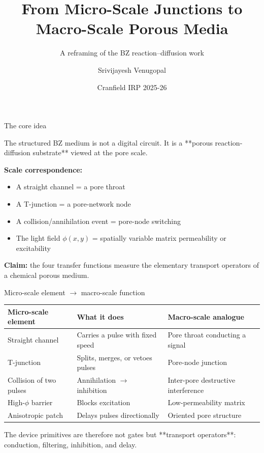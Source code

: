 \documentclass[aspectratio=169,11pt]{beamer}
\title{From Micro-Scale Junctions to Macro-Scale Porous Media}
\subtitle{A reframing of the BZ reaction--diffusion work}
\author{Srivijayesh Venugopal}
\date{Cranfield IRP 2025-26}
\begin{document}
\begin{frame}
\titlepage
\end{frame}

\begin{frame}{The core idea}

The structured BZ medium is not a digital circuit. It is a **porous reaction-diffusion substrate** viewed at the pore scale.

\vspace{0.4cm}
\textbf{Scale correspondence:}
\begin{itemize}
    \item A straight channel = a pore throat
    \item A T-junction = a pore-network node
    \item A collision/annihilation event = pore-node switching
    \item The light field $\phi(x,y)$ = spatially variable matrix permeability or excitability
\end{itemize}

\vspace{0.3cm}
\textbf{Claim:} the four transfer functions measure the elementary transport operators of a chemical porous medium.

\end{frame}

\begin{frame}{Micro-scale element $\rightarrow$ macro-scale function}

\begin{table}
\centering
\footnotesize
\begin{tabular}{p{3.5cm}p{4.5cm}p{5.0cm}}
\toprule
\textbf{Micro-scale element} & \textbf{What it does} & \textbf{Macro-scale analogue} \\
\midrule
Straight channel & Carries a pulse with fixed speed & Pore throat conducting a signal \\
T-junction & Splits, merges, or vetoes pulses & Pore-node junction \\
Collision of two pulses & Annihilation $\rightarrow$ inhibition & Inter-pore destructive interference \\
High-$\phi$ barrier & Blocks excitation & Low-permeability matrix \\
Anisotropic patch & Delays pulses directionally & Oriented pore structure \\
\bottomrule
\end{tabular}
\end{table}

\vspace{0.3cm}
The device primitives are therefore not gates but **transport operators**: conduction, filtering, inhibition, and delay.

\end{frame}
\end{document}
